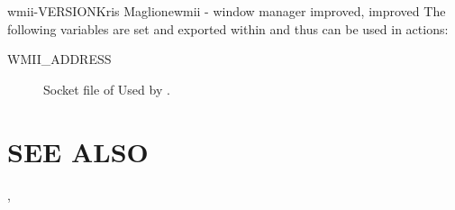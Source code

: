\begin{Name}{1}{wmii-VERSION}{Kris Maglione}{}{wmii - window manager improved, improved}
The following variables are set and exported within  and
thus can be used in actions:

\begin{description}
\item[WMII\_ADDRESS] Socket file of Used by .
\end{description}

\section{SEE ALSO}
, 

\end{Name}

